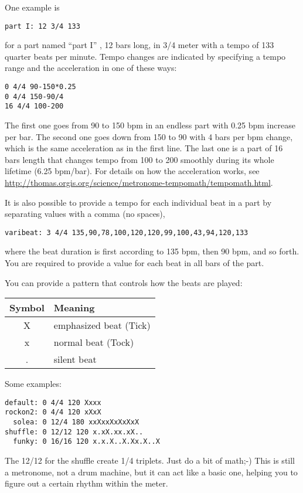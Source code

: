 One example is
\begin{verbatim}
part I: 12 3/4 133
\end{verbatim}
for a part named ``part I'' , 12 bars long, in 3/4 meter with
a tempo of 133 quarter beats per minute.
Tempo changes are indicated by specifying a tempo range and the
acceleration in one of these ways:
\begin{verbatim}
0 4/4 90-150*0.25
0 4/4 150-90/4
16 4/4 100-200
\end{verbatim}
The first one goes from 90 to 150 bpm in an endless part with 0.25 bpm
increase per bar. The second one goes down from 150 to 90 with
4 bars per bpm change, which is the same acceleration as in the first line.
The last one is a part of 16 bars length that changes tempo from 100 to 200
smoothly during its whole lifetime (6.25 bpm/bar). For details on how the
acceleration works, see
\url{http://thomas.orgis.org/science/metronome-tempomath/tempomath.html}.

It is also possible to provide a tempo for each individual beat in a part
by separating values with a comma (no spaces),
\begin{verbatim}
varibeat: 3 4/4 135,90,78,100,120,120,99,100,43,94,120,133
\end{verbatim}
where the beat duration is first according to 135 bpm, then 90 bpm,
and so forth. You are required to provide a value for each beat
in all bars of the part.

You can provide a pattern that controls how the beats are played:
\begin{center}
\begin{tabular}{c|l}
    Symbol & Meaning \\
    \hline
    X & emphasized beat (Tick) \\
    x & normal beat (Tock) \\
    . & silent beat
\end{tabular}
\end{center}

Some examples:
\begin{verbatim}
default: 0 4/4 120 Xxxx
rockon2: 0 4/4 120 xXxX
  solea: 0 12/4 180 xxXxxXxXxXxX
shuffle: 0 12/12 120 x.xX.xx.xX..
  funky: 0 16/16 120 x.x.X..X.Xx.X..X
\end{verbatim}
The 12/12 for the shuffle create 1/4 triplets. Just do a bit of math;-)
This is still a metronome, not a drum machine, but it can act like a basic
one, helping you to figure out a certain rhythm within the meter.

